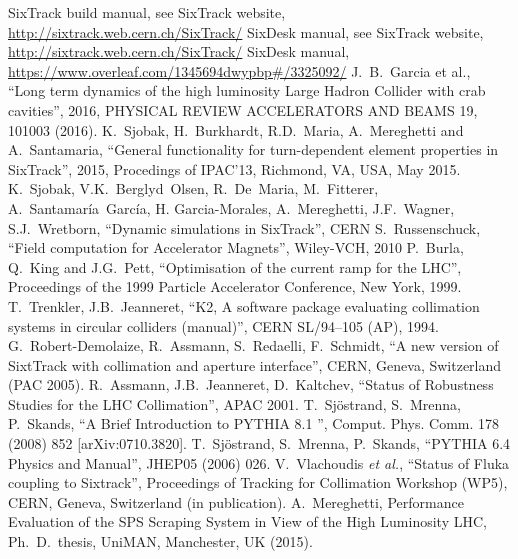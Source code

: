 \begin{thebibliography}{99}
        SixTrack build manual, see SixTrack website, \url{http://sixtrack.web.cern.ch/SixTrack/}
        SixDesk manual, see SixTrack website, \url{http://sixtrack.web.cern.ch/SixTrack/}
        SixDesk manual, \url{https://www.overleaf.com/1345694dwypbp#/3325092/}
        J.~B.~Garcia et al.,
        ``Long term dynamics of the high luminosity Large Hadron Collider with crab cavities'',
        2016, PHYSICAL REVIEW ACCELERATORS AND BEAMS 19, 101003 (2016).
        K.~Sjobak, H.~Burkhardt, R.D.~Maria, A.~Mereghetti and A.~Santamaria,
        ``General functionality for turn-dependent element properties in SixTrack'',
        2015, Procedings of IPAC'13, Richmond, VA, USA, May 2015.
        K.~Sjobak, V.K.~Berglyd~Olsen, R.~De~Maria, M.~Fitterer, A.~Santamaría~García, H. Garcia-Morales, A.~Mereghetti, J.F.~Wagner, S.J.~Wretborn,
        ``Dynamic simulations in SixTrack'',
        CERN
        S.~Russenschuck,
        ``Field computation for Accelerator Magnets'',
        Wiley-VCH, 2010
        P.~Burla, Q.~King and J.G.~Pett,
        ``Optimisation of the current ramp for the LHC'',
        Proceedings of the 1999 Particle Accelerator Conference, New York, 1999.
        T.~Trenkler, J.B.~Jeanneret,
        ``K2, A software package evaluating collimation systems in circular colliders (manual)'',
        CERN SL/94–105 (AP), 1994.
        G.~Robert-Demolaize, R.~Assmann, S.~Redaelli, F.~Schmidt,
        ``A new version of SixtTrack with collimation and aperture interface'',
        CERN, Geneva, Switzerland (PAC 2005).
        R.~Assmann, J.B.~Jeanneret, D.~Kaltchev,
        ``Status of Robustness Studies for the LHC Collimation'',
        APAC 2001.
        T.~Sjöstrand, S.~Mrenna, P.~Skands,
        ``A Brief Introduction to PYTHIA 8.1 '',
        Comput. Phys. Comm. 178 (2008) 852 [arXiv:0710.3820].
        T.~Sjöstrand, S.~Mrenna, P.~Skands,
        ``PYTHIA 6.4 Physics and Manual'',
        JHEP05 (2006) 026.
        V.~Vlachoudis {\it et al.}, ``Status of Fluka coupling to Sixtrack'',
        Proceedings of Tracking for Collimation Workshop (WP5), CERN, Geneva,
        Switzerland (in publication).
        A.~Mereghetti, Performance Evaluation of the SPS Scraping System
        in View of the High Luminosity LHC, Ph.~D.~thesis, UniMAN, Manchester,
        UK (2015).
\end{thebibliography}
